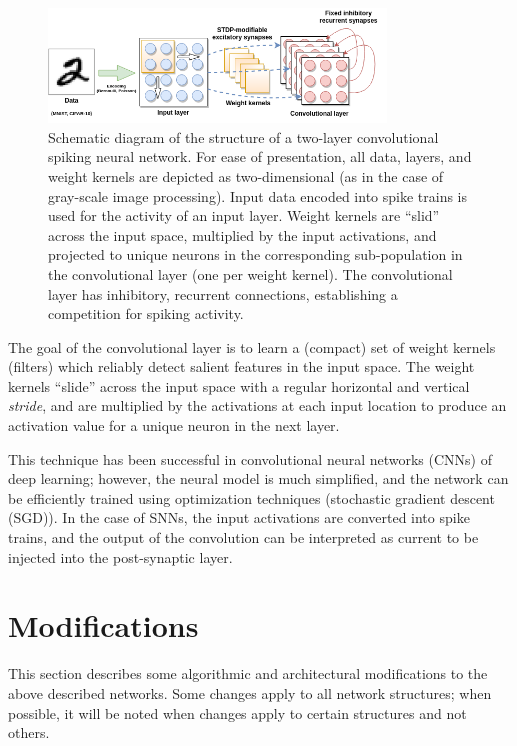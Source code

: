 \documentclass{article}
\begin{document}
\begin{figure}[h]
	\centering
	\includegraphics[width=0.8\textwidth]{two_layer_convolutional_snn.png}
	\caption{Schematic diagram of the structure of a two-layer convolutional spiking neural network. For ease of presentation, all data, layers, and weight kernels are depicted as two-dimensional (as in the case of gray-scale image processing). Input data encoded into spike trains is used for the activity of an input layer. Weight kernels are ``slid'' across the input space, multiplied by the input activations, and projected to unique neurons in the corresponding sub-population in the convolutional layer (one per weight kernel). The convolutional layer has inhibitory, recurrent connections, establishing a competition for spiking activity.}
\end{figure}

The goal of the convolutional layer is to learn a (compact) set of weight kernels (filters) which reliably detect salient features in the input space. The weight kernels ``slide'' across the input space with a regular horizontal and vertical \textit{stride}, and are multiplied by the activations at each input location to produce an activation value for a unique neuron in the next layer.

This technique has been successful in convolutional neural networks (CNNs) of deep learning; however, the neural model is much simplified, and the network can be efficiently trained using optimization techniques (stochastic gradient descent (SGD)). In the case of SNNs, the input activations are converted into spike trains, and the output of the convolution can be interpreted as current to be injected into the post-synaptic layer.

\section{Modifications}

This section describes some algorithmic and architectural modifications to the above described networks. Some changes apply to all network structures; when possible, it will be noted when changes apply to certain structures and not others.
\end{document}
